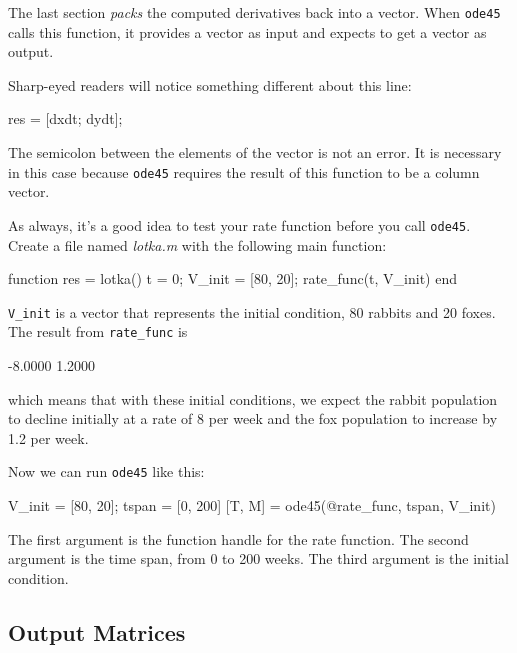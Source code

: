 \documentclass[../../book.tex]{subfiles}
\begin{document}
The last section \emph{packs} the computed derivatives back into a
vector.  When \lstinline{ode45} calls this function, it provides a vector
as input and expects to get a vector as output.

Sharp-eyed readers will notice something different about this line:

\begin{code}
    res = [dxdt; dydt];
\end{code}

The semicolon between the elements of the vector is not an error.  It
is necessary in this case because \lstinline{ode45} requires the result of
this function to be a column vector.


As always, it's a good idea to test your rate function before you call \lstinline{ode45}.
Create a file named \emph{lotka.m} with the following main function:

\begin{code}
function res = lotka()
    t = 0;
    V_init = [80, 20];
    rate_func(t, V_init)
end
\end{code}


\lstinline{V_init} is a vector that represents the initial condition, 80 rabbits and 20 foxes.
The result from \lstinline{rate_func} is

\begin{code}
-8.0000
 1.2000
 \end{code}
which means that with these initial conditions, we expect the rabbit population to decline initially at a rate of 8 per week and the fox population to increase by 1.2 per week.

Now we can run \lstinline{ode45} like this:

\begin{code}
V_init = [80, 20];
tspan = [0, 200]
[T, M] = ode45(@rate_func, tspan, V_init)
\end{code}

The first argument is the function handle for the rate function.
The second argument is the time span, from 0 to 200 weeks.
The third argument is the initial condition.



\subsection{Output Matrices}
\end{document}
